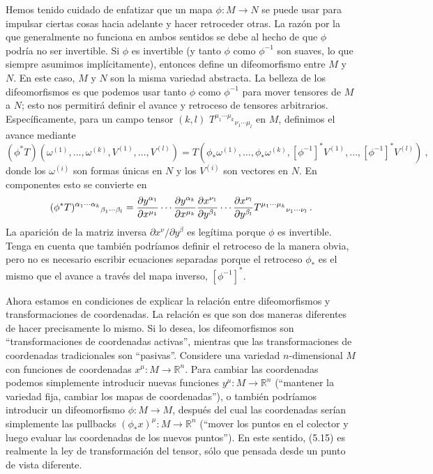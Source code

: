 \documentclass[11pt,b5paper,openany,twoside]{book}
\newcommand{\R}{\mathbb{R}}
\begin{document}
Hemos tenido cuidado de enfatizar que un mapa $\phi:M\rightarrow N$ se puede usar para impulsar ciertas cosas hacia adelante y hacer retroceder otras.
La razón por la que generalmente no funciona en ambos sentidos se debe al hecho de que $\phi$ podría no ser invertible.
Si $\phi$ es invertible (y tanto $\phi$ como $\phi^{-1}$ son suaves, lo que siempre asumimos implícitamente), entonces define un difeomorfismo entre $M$ y $N$.
En este caso, $M$ y $N$ son la misma variedad abstracta.
La belleza de los difeomorfismos es que podemos usar tanto $\phi$ como $\phi^{-1}$ para mover tensores de $M$ a $N$; esto nos permitirá definir el avance y retroceso de tensores arbitrarios.
Específicamente, para un campo tensor $(k,l)$ $T^{\mu_1 \cdots \mu_k}{}_{\nu_1 \cdots \mu_l}$ en $M$, definimos el avance mediante
\begin{equation}
(\phi^*T)(\omega^{(1)},\ldots ,\omega^{(k)},V^{(1)},\ldots ,V^{(l)})
= T(\phi_*\omega^{(1)},\ldots ,\phi_*\omega^{(k)},
[\phi^{-1}]^*V^{(1)},\ldots ,[\phi^{-1}]^*V^{(l)})\ ,\label{5.14}
\end{equation}
donde los $\omega^{(i)}$ son formas únicas en $N$ y los $V^{(i)}$ son vectores en $N$.
En componentes esto se convierte en
\begin{equation}
(\phi^*T)^{\alpha_1 \cdots \alpha_k}{}_{\beta_1 \cdots \beta_l}
= {{\partial y^{\alpha_1}}
\over{\partial x^{\mu_1}}}\cdots{{\partial y^{\alpha_k}}
\over{\partial x^{\mu_k}}}{{\partial x^{\nu_1}}
\over{\partial y^{\beta_1}}}\cdots{{\partial x^{\nu_l}}
\over{\partial y^{\beta_l}}}T^{\mu_1 \cdots \mu_k}{}_{\nu_1
\cdots \nu_l}\,.\label{5.15}
\end{equation}
La aparición de la matriz inversa $\partial x^\nu/\partial y^\beta$ es legítima porque $\phi$ es invertible.
Tenga en cuenta que también podríamos definir el retroceso de la manera obvia, pero no es necesario escribir ecuaciones separadas porque el retroceso $\phi_*$ es el mismo que el avance a través del mapa inverso, $[\phi^{-1}]^*$.

Ahora estamos en condiciones de explicar la relación entre difeomorfismos y transformaciones de coordenadas.
La relación es que son dos maneras diferentes de hacer precisamente lo mismo.
Si lo desea, los difeomorfismos son ``transformaciones de coordenadas activas'', mientras que las transformaciones de coordenadas tradicionales son ``pasivas''. Considere una variedad $n$-dimensional $M$ con funciones de coordenadas $x^\mu :M\rightarrow \R^n$.
Para cambiar las coordenadas podemos simplemente introducir nuevas funciones $y^\mu :M\rightarrow \R^n$ (``mantener la variedad fija, cambiar los mapas de coordenadas''), o también podríamos introducir un difeomorfismo $\phi:M\rightarrow M$, después del cual las coordenadas serían simplemente las pullbacks $(\phi_*x)^\mu:M\rightarrow \R^n$ (``mover los puntos en el colector y luego evaluar las coordenadas de los nuevos puntos'').
En este sentido, (5.15) es realmente la ley de transformación del tensor, sólo que pensada desde un punto de vista diferente.
\end{document}
